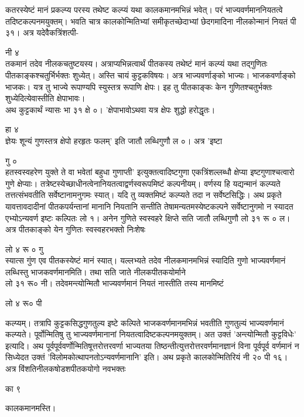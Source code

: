 \documentclass[11pt, openany]{book}
\begin{document}
\begin{sloppypar}
\hangindent=0.2in कतरस्येष्टं मानं प्रकल्प्य परस्य तथेष्ट कल्प्यं यथा कालकमानमभिन्नं भवेत्। परं भाज्यवर्णमाननियतत्वे तदिष्टकल्पनमयुक्तम्। भवति चात्र कालकोन्मितिभ्यां समीकृतच्छेदाभ्यां छेदगमादिना नीलकोन्मानं नियतं पी ३१। अत्र यदेवैकत्रिंशत्पी-

\hspace{1.25in}नी ४\\

\hangindent=0.2in तकमानं तदेव नीलकचतुष्टयस्य। अत्राप्यभिन्नत्वार्थं पीतकस्य तथेष्टं मानं कल्प्यं यथा तद्गुणितः पीतकाङ्कश्चतुर्भिर्भक्तः शुध्येत्। अस्ति चायं कुट्टकविषयः। अत्र भाज्यवर्णाङ्को भाज्यः। भाजकवर्णाङ्को भाजकः। यत्र तु भाज्ये रूपाण्यपि स्युस्तत्र रूपाणि क्षेपः। इह तु पीतकाङ्कः केन गुणितश्चतुर्भक्तः शुध्येदित्येवास्तीति क्षेपाभावः।\\

\hangindent=0.2in \hspace{0.2in}अथ कुट्टकार्थं न्यासः भा ३१ क्षे ०। 'क्षेपाभावोऽथवा यत्र क्षेपः शुद्धो हरोद्धृतः।

\hspace{1.6in}हा ४\\

\hangindent=0.2in ज्ञेयः शून्यं गुणस्तत्र क्षेपो हरहृतः फलम्' इति जातौ लब्धिगुणौ ल ०। अत्र 'इष्टा

\hspace{3.75in}गु ०\\

\hangindent=0.2in हतस्वस्वहरेण युक्ते ते वा भवेतां बहुधा गुणाप्ती' इत्युक्तत्वादिष्टगुणा एकत्रिंशल्लब्धौ क्षेप्या इष्टगुणाश्चत्वारो गुणे क्षेप्याः। तत्रेष्टस्येच्छाधीनत्वेनानियतत्वाद्वर्णस्वरूपमिष्टं कल्पनीयम्। वर्णस्य हि यद्यन्मानं कल्प्यते तत्तत्संभवतीति सर्वेष्टानामनुगमः स्यात्। यदि तु व्यक्तमिष्टं कल्प्यते तदा न सर्वेष्टसिद्धिः। अथ प्रकृते यावत्तावदादीनां पीतकपर्यन्तानां मानानि नियतानि सन्तीति तेषामन्यतमस्येष्टकल्पने सर्वेष्टानुगमो न स्यादत एभ्योऽन्यवर्ण इष्टः कल्पितः लो १। अनेन गुणिते स्वस्वहरे क्षिप्ते सति जातौ लब्धिगुणौ लो ३१ रू ० ल। अत्र पीतकाङ्को येन गुणितः स्वस्वहरभक्तो निःशेषः 

\hspace{1.7in}लो ४ रू ० गु\\

\hangindent=0.2in स्यात्स गुंण एव पीतकस्येष्टं मानं स्यात्। यल्लभ्यते तदेव नीलकमानमभिन्नं स्यादिति गुणो भाज्यवर्णमानं लब्धिस्तु भाजकवर्णमानमिति। तथा सति जाते नीलकपीतकयोर्माने\\ लो ३१ रू० नी। तदेवमन्त्योन्मितौ भाज्यवर्णमानं नियतं नास्तीति तस्य मानमिष्टं

लो ४ रू० पी

\hangindent=0.2in कल्प्यम्। तत्रापि कुट्टकसिद्धगुणतुल्य इष्टे कल्पिते भाजकवर्णमानमभिन्नं भवतीति गुणतुल्यं भाज्यवर्णमानं कल्प्यते। पूर्वोन्मितिषु तु भाज्यवर्णमानानां नियतत्वादिष्टकल्पनमयुक्तम्। अत उक्तं 'अन्त्योन्मितौ कुट्टविधेः' इत्यादि। अथ पूर्वपूर्ववर्णोन्मितिषूत्तरोत्तरवर्णा भाज्यतया तिष्ठन्तीत्युत्तरोत्तरवर्णमानज्ञानं विना पूर्वपूर्व वर्णमानं न सिध्येदत उक्तं 'विलोमकोत्थापनतोऽन्यवर्णमानानि' इति। अथ प्रकृते कालकोन्मितिरियं नी २० पी १६। अत्र विंशतिनीलकषोडशपीतकयोगो नवभक्तः 

\hspace{2.25in}का ९
 
कालकमानमस्ति।
\end{sloppypar}
\end{document}
